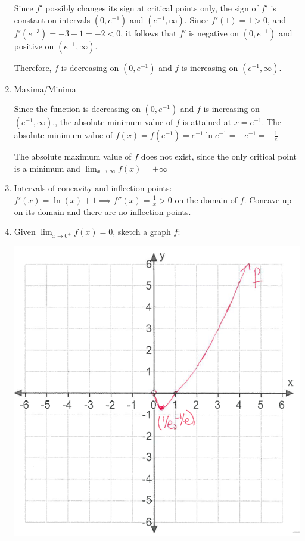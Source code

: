 \documentclass[nooutcomes,handout]{ximera}
\begin{document}
\begin{problem}
\begin{freeResponse}
\begin{enumerate}
Since $f'$ possibly changes its sign at critical points only, the sign of $f'$ is constant on intervals $(0,e^{-1})$ and $(e^{-1},\infty)$. 
Since $f'(1)=1>0$, and $f'(e^{-3})=-3+1=-2<0$, it follows that $f'$ is negative on $(0,e^{-1})$ and positive on $(e^{-1},\infty)$. 

Therefore, $f$ is decreasing on $(0,e^{-1})$ and $f$ is increasing on $(e^{-1},\infty)$. 

\item  Maxima/Minima

Since the function is decreasing on $(0,e^{-1})$ and $f$ is increasing on $(e^{-1},\infty)$., the absolute minimum value of $f$ is attained at $x=e^{-1}$.  The absolute minimum value of $f(x)=f(e^{-1})=e^{-1}\ln e^{-1}=-e^{-1}=-\frac{1}{e}$

The absolute maximum value of $f$ does not exist, since the only critical point is a minimum and $\lim_{x \to \infty}f(x)=+\infty$

\item Intervals of concavity and inflection points:
$f'(x)=\ln(x)+1 \implies f''(x)=\frac{1}{x}>0$ on the domain of $f$.  Concave up on its domain and there are no inflection points.

\item Given $\lim_{x \to 0^+}f(x)=0$, sketch a graph $f$:
        \begin{image}
        \includegraphics[scale = .7]{figure7.png}
      \end{image}





\end{enumerate}
\end{freeResponse}
\end{problem}
\end{document}
